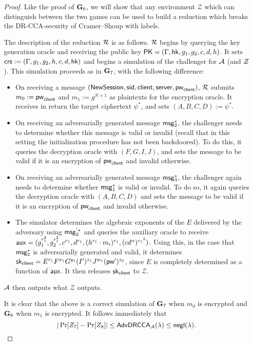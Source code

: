 \begin{proof}
	Like the proof of $\mathbf{G}_6$, we will show that any environment $\mathcal{Z}$ which can distinguish between the two games can be used to build a reduction which breaks the DR-CCA-security of Cramer--Shoup with labels.
	
	The description of the reduction $\mathcal{R}$ is as follows. $\mathcal{R}$ begins by querying the key generation oracle and receiving the public key $\mathsf{PK} = (\Gamma,\mathsf{hk},g_1,g_2,c,d,h)$. It sets $\mathsf{crs} := (\Gamma,g_1,g_2,h,c,d,\mathsf{hk})$ and begins a simulation of the challenger for $\mathcal{A}$ (and $\mathcal{Z}$). This simulation proceeds as in $\mathbf{G}_7$, with the following difference:
	
	\begin{itemize}
		\item On receiving a message $(\mathsf{NewSession},\mathsf{sid},\mathsf{client},\mathsf{server},\mathsf{pw}_{\mathsf{client}})$, $\mathcal{R}$ submits $m_0:=\mathsf{pw}_{\mathsf{client}}$ and $m_1:=g^{N+1}$ as plaintexts for the encryption oracle. It receives in return the target ciphertext $\psi^{*}$, and sets $(A,B,C,D):=\psi^{*}$.
		\item On receiving an adversarially generated message $\mathsf{msg}_{2}^{*}$, the challenger needs to determine whether this message is valid or invalid (recall that in this setting the initialization procedure has not been backdoored). To do this, it queries the decryption oracle with $(F,G,I,J)$, and sets the message to be valid if it is an encryption of $\mathsf{pw}_{\mathsf{client}}$ and invalid otherwise.
		\item On receiving an adversarially generated message $\mathsf{msg}_{3}^{*}$, the challenger again needs to determine whether $\mathsf{msg}_{1}^{*}$ is valid or invalid. To do so, it again queries the decryption oracle with $(A,B,C,D)$ and sets the message to be valid if it is an encryption of $\mathsf{pw}_{\mathsf{client}}$ and invalid otherwise.
		\item The simulator determines the algebraic exponents of the $E$ delivered by the adversary using $\mathsf{msg}_{2}^{'*}$ and queries the auxiliary oracle to receive $\mathsf{aux} = (g_1^{r_1^2}, g_2^{r_1^2}, c^{r_1}, d^{r_1},(h^{r_1}\cdot m_i)^{r_1},(cd^{\alpha})^{{r_1}^2})$. Using this, in the case that $\mathsf{msg}_{2}^{*}$ is adversarially generated and valid, it determines $\mathsf{sk}_{\mathsf{client}} = E^{r_1}F^{x_1}G^{y_1}(I')^{z_1}J^{w_1}(\mathsf{pw}')^{z_2}$, since $E$ is completely determined as a function of $\mathsf{aux}$. It then releases $\mathsf{sk}_{\mathsf{client}}$ to $\mathcal{Z}$.
	\end{itemize}

	$\mathcal{A}$ then outputs what $\mathcal{Z}$ outputs.
	
	It is clear that the above is a correct simulation of $\mathbf{G}_7$ when $m_0$ is encrypted and $\mathbf{G}_8$ when $m_1$ is encrypted. It follows immediately that $$|\Pr[Z_7]-\Pr[Z_8]|\leq\mathsf{AdvDRCCA}_{\mathcal{A}}(\lambda)\leq\mathsf{negl}(\lambda).$$
\end{proof}

